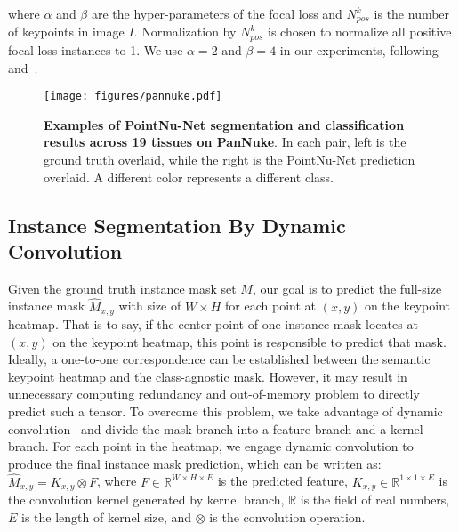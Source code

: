 \documentclass[lettersize,journal]{IEEEtran}
\begin{document}
where $\alpha$ and $\beta$ are the hyper-parameters of the focal loss and $N_{pos}^k$ is the number of keypoints in image $I$. Normalization by $N_{pos}^k$ is chosen  to normalize all positive focal loss instances to 1. We use $\alpha=2$ and $\beta=4$ in our experiments, following \cite{Cornernet} and~\cite{CenterNet}.

\begin{figure*}[t]
\centering
\texttt{[image: figures/pannuke.pdf]}
\caption{\textbf{Examples of PointNu-Net segmentation and classification results across 19 tissues on PanNuke}. In each pair, left is the ground truth overlaid, while the right is the PointNu-Net prediction overlaid. A different color represents a different class.}
\label{fig:pan}
\end{figure*}


\subsection{Instance Segmentation By Dynamic Convolution}
Given the ground truth instance mask set $M$, our goal is to predict the full-size instance mask $\hat{M}_{x,y}$ with size of $W \times H$ for each point at $(x,y)$ on the keypoint heatmap. That is to say, if the center point of one instance mask locates at $(x,y)$ on the keypoint heatmap, this point is responsible to predict that mask. 
Ideally, a one-to-one correspondence can be established between the semantic keypoint heatmap and the class-agnostic mask. However, it may result in unnecessary computing redundancy and out-of-memory problem to directly predict such a tensor. To overcome this problem, we take advantage of dynamic convolution~\cite{condinst,solov2} and divide the mask branch into a feature branch and a kernel branch. For each point in the heatmap, we engage dynamic convolution to produce the final instance mask prediction, which can be written as:
$\hat{M}_{x,y}=K_{x,y}\otimes F$,
where $F \in {\mathbb{R}}^{W \times H \times E}$ is the predicted feature, $K_{x,y} \in {\mathbb{R}}^{1 \times 1 \times E}$ is the convolution kernel generated by kernel branch, $\mathbb{R}$ is the field of real numbers, $E$ is the length of kernel size, and $\otimes$ is the convolution operation. 
\end{document}
